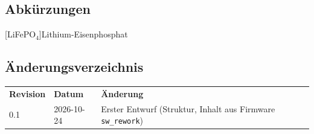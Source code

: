 \subsection{Abkürzungen}
\begin{acronym}[ESC]
    [LiFePO$_4$]{Lithium-Eisenphosphat}
\end{acronym}

\subsection{Änderungsverzeichnis}
\begin{tabular}{lll}
    \rowcolor{gray} \textbf{Revision} & \textbf{Datum} & \textbf{Änderung} \\
    0.1 & 2026-10-24 & Erster Entwurf (Struktur, Inhalt aus Firmware \texttt{sw\_rework}) \\
\end{tabular}
